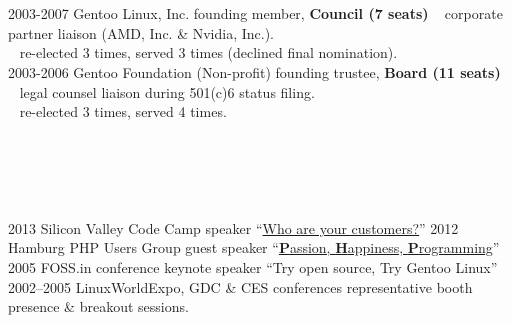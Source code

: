 \documentclass[]{friggeri-cv} %
\begin{document}
\section{{} {} {\normalsize {}~~}}
\begin{entrylist}
\entry
{2003-2007}
{Gentoo Linux, Inc.}
{founding member, {\textbf{\color{DarkGray}Council (7 seats)}}}
{{\tiny {}} ~ corporate partner liaison (AMD, Inc. \& Nvidia, Inc.).\\
{\tiny {}} ~ re-elected 3 times, served 3 times (declined final nomination).\\}
\entry
{2003-2006}
{Gentoo Foundation (Non-profit)}
{founding trustee, {\textbf{\color{DarkGray}Board (11 seats)}}}
{{\tiny {}} ~ legal counsel liaison during 501(c)6 status filing.\\
{\tiny {}} ~ re-elected 3 times, served 4 times.}
\end{entrylist}
\section{{} {} {\normalsize {}~~}}

\begin{entrylist}
\entry
{2013}
{Silicon Valley Code Camp}
{speaker}
{``\href{http://www.siliconvalley-codecamp.com/Session/2013/who-are-your-customers}{Who are your customers?}''}
\entry
{2012}
{Hamburg PHP Users Group}
{guest speaker}
{``\href{https://speakerdeck.com/seemantk/developing-with-passion}{\textbf{P}assion, \textbf{H}appiness, \textbf{P}rogramming}''}
\entry
{2005}
{FOSS.in conference}
{keynote speaker}
{``Try open source, Try Gentoo Linux''}
\entry
{2002--2005}
{LinuxWorldExpo, GDC \& CES conferences}
{representative}
{booth presence \& breakout sessions.}
\end{entrylist}
\end{document}
